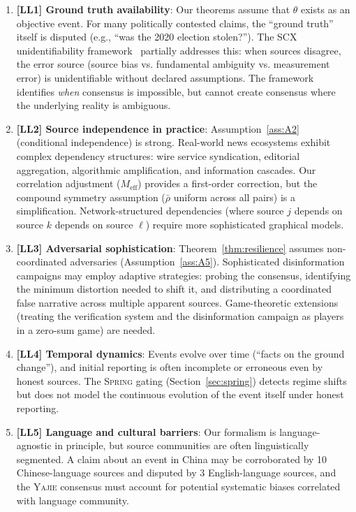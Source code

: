 \documentclass[11pt,a4paper]{article}
\theoremstyle{definition}
\newcommand{\Yajie}{\textsc{Yajie}}
\newcommand{\Spring}{\textsc{Spring}}
\newcommand{\SCX}{\textsc{SCX}}
\newcommand{\limitationTag}[1]{\textsf{\textbf{[L#1]}}}
\begin{document}
\begin{enumerate}[label=(\roman*)]
    \item \textbf{\limitationTag{L1} Ground truth availability}: Our theorems assume that $\theta$ exists as an objective event. For many politically contested claims, the ``ground truth'' itself is disputed (e.g., ``was the 2020 election stolen?''). The \SCX{} unidentifiability framework~\cite{SCX2025} partially addresses this: when sources disagree, the error source (source bias vs. fundamental ambiguity vs. measurement error) is unidentifiable without declared assumptions. The framework identifies \textit{when} consensus is impossible, but cannot create consensus where the underlying reality is ambiguous.
    \item \textbf{\limitationTag{L2} Source independence in practice}: Assumption~\ref{ass:A2} (conditional independence) is strong. Real-world news ecosystems exhibit complex dependency structures: wire service syndication, editorial aggregation, algorithmic amplification, and information cascades. Our correlation adjustment ($M_{\mathrm{eff}}$) provides a first-order correction, but the compound symmetry assumption ($\bar{\rho}$ uniform across all pairs) is a simplification. Network-structured dependencies (where source $j$ depends on source $k$ depends on source $\ell$) require more sophisticated graphical models.
    \item \textbf{\limitationTag{L3} Adversarial sophistication}: Theorem~\ref{thm:resilience} assumes non-coordinated adversaries (Assumption~\ref{ass:A5}). Sophisticated disinformation campaigns may employ adaptive strategies: probing the consensus, identifying the minimum distortion needed to shift it, and distributing a coordinated false narrative across multiple apparent sources. Game-theoretic extensions (treating the verification system and the disinformation campaign as players in a zero-sum game) are needed.
    \item \textbf{\limitationTag{L4} Temporal dynamics}: Events evolve over time (``facts on the ground change''), and initial reporting is often incomplete or erroneous even by honest sources. The \Spring{} gating (Section~\ref{sec:spring}) detects regime shifts but does not model the continuous evolution of the event itself under honest reporting.
    \item \textbf{\limitationTag{L5} Language and cultural barriers}: Our formalism is language-agnostic in principle, but source communities are often linguistically segmented. A claim about an event in China may be corroborated by 10 Chinese-language sources and disputed by 3 English-language sources, and the \Yajie{} consensus must account for potential systematic biases correlated with language community.
\end{enumerate}
\end{document}
